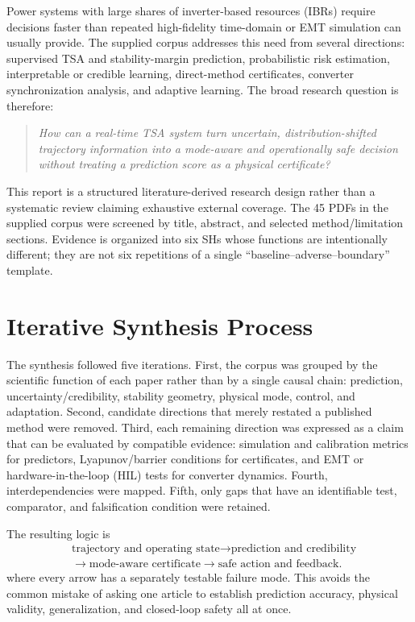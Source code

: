 \documentclass[conference]{IEEEtran}
\begin{document}
Power systems with large shares of inverter-based resources (IBRs) require decisions faster than repeated high-fidelity time-domain or EMT simulation can usually provide. The supplied corpus addresses this need from several directions: supervised TSA and stability-margin prediction, probabilistic risk estimation, interpretable or credible learning, direct-method certificates, converter synchronization analysis, and adaptive learning. The broad research question is therefore:

\begin{quote}
\emph{How can a real-time TSA system turn uncertain, distribution-shifted trajectory information into a mode-aware and operationally safe decision without treating a prediction score as a physical certificate?}
\end{quote}

This report is a structured literature-derived research design rather than a systematic review claiming exhaustive external coverage. The 45 PDFs in the supplied corpus were screened by title, abstract, and selected method/limitation sections. Evidence is organized into six SHs whose functions are intentionally different; they are not six repetitions of a single ``baseline--adverse--boundary'' template.

\section{Iterative Synthesis Process}

The synthesis followed five iterations. First, the corpus was grouped by the scientific function of each paper rather than by a single causal chain: prediction, uncertainty/credibility, stability geometry, physical mode, control, and adaptation. Second, candidate directions that merely restated a published method were removed. Third, each remaining direction was expressed as a claim that can be evaluated by compatible evidence: simulation and calibration metrics for predictors, Lyapunov/barrier conditions for certificates, and EMT or hardware-in-the-loop (HIL) tests for converter dynamics. Fourth, interdependencies were mapped. Fifth, only gaps that have an identifiable test, comparator, and falsification condition were retained.

The resulting logic is
\begin{equation}
\begin{aligned}
  &\text{trajectory and operating state}
    \rightarrow \text{prediction and credibility}\\
  &\rightarrow \text{mode-aware certificate}
    \rightarrow \text{safe action and feedback}.
\end{aligned}
\label{eq:logic}
\end{equation}
where every arrow has a separately testable failure mode. This avoids the common mistake of asking one article to establish prediction accuracy, physical validity, generalization, and closed-loop safety all at once.
\end{document}

